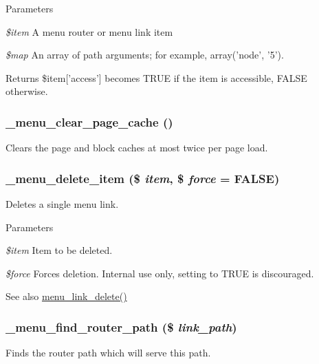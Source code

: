 \begin{DoxyParams}{Parameters}
\item[{\em \$item}]A menu router or menu link item \item[{\em \$map}]An array of path arguments; for example, array('node', '5').\end{DoxyParams}
\begin{DoxyReturn}{Returns}
\$item\mbox{[}'access'\mbox{]} becomes TRUE if the item is accessible, FALSE otherwise. 
\end{DoxyReturn}
\hypertarget{group__menu_ga6b3bf9ba8f43f983382911beb62ffba0}{
\subsubsection[{\_\-menu\_\-clear\_\-page\_\-cache}]{\setlength{\rightskip}{0pt plus 5cm}\_\-menu\_\-clear\_\-page\_\-cache ()}}
\label{group__menu_ga6b3bf9ba8f43f983382911beb62ffba0}
Clears the page and block caches at most twice per page load. \hypertarget{group__menu_gaf60be5755b46e635c04963e61cdc809a}{
\subsubsection[{\_\-menu\_\-delete\_\-item}]{\setlength{\rightskip}{0pt plus 5cm}\_\-menu\_\-delete\_\-item (\$ {\em item}, \/  \$ {\em force} = {\ttfamily FALSE})}}
\label{group__menu_gaf60be5755b46e635c04963e61cdc809a}
Deletes a single menu link.


\begin{DoxyParams}{Parameters}
\item[{\em \$item}]Item to be deleted. \item[{\em \$force}]Forces deletion. Internal use only, setting to TRUE is discouraged.\end{DoxyParams}
\begin{DoxySeeAlso}{See also}
\hyperlink{group__menu_gacb2dddc8ca84476f38a90f4487156b12}{menu\_\-link\_\-delete()} 
\end{DoxySeeAlso}
\hypertarget{group__menu_ga0842f6b9cf84f5e5ff159159063a78dd}{
\subsubsection[{\_\-menu\_\-find\_\-router\_\-path}]{\setlength{\rightskip}{0pt plus 5cm}\_\-menu\_\-find\_\-router\_\-path (\$ {\em link\_\-path})}}
\label{group__menu_ga0842f6b9cf84f5e5ff159159063a78dd}
Finds the router path which will serve this path.


